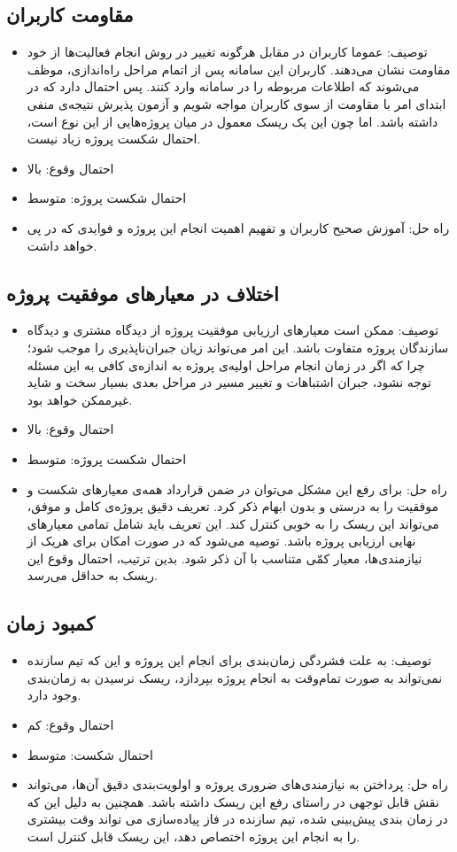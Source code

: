 \subsection{مقاومت کاربران}
\begin{itemize}
\item توصیف: عموما کاربران در مقابل هرگونه تغییر در روش انجام فعالیت‌ها از خود مقاومت نشان می‌دهند. کاربران این سامانه پس از اتمام مراحل راه‌اندازی، موظف می‌شوند که اطلاعات مربوطه را در سامانه وارد کنند. پس احتمال دارد که در ابتدای امر با مقاومت از سوی کاربران مواجه شویم و آزمون پذیرش نتیجه‌ی منفی داشته باشد. اما چون این یک ریسک معمول در میان پروژه‌هایی از این نوع است، احتمال شکست پروژه زیاد نیست.
\item احتمال وقوع: بالا
\item احتمال شکست پروژه: متوسط
\item راه حل: آموزش صحیح کاربران و تفهیم اهمیت انجام این پروژه و فوایدی که در پی خواهد داشت.
\end{itemize}

\subsection{اختلاف در معیارهای موفقیت پروژه}
\begin{itemize}
\item توصیف: ممکن است معیارهای ارزیابی موفقیت پروژه از دیدگاه مشتری و دیدگاه سازندگان پروژه متفاوت باشد. این امر می‌تواند زیان جبران‌ناپذیری را موجب شود؛ چرا که اگر در زمان انجام مراحل اولیه‌ی پروژه به اندازه‌ی کافی به این مسئله توجه نشود، جبران اشتباهات و تغییر مسیر در مراحل بعدی بسیار سخت و شاید غیرممکن خواهد بود.
\item احتمال وقوع: بالا
\item احتمال شکست پروژه: متوسط
\item راه حل: برای رفع این مشکل می‌توان در ضمن قرارداد همه‌ی معیارهای شکست و موفقیت را به درستی و بدون ابهام ذکر کرد. تعریف دقیق پروژه‌ی کامل و موفق، می‌تواند این ریسک را به خوبی کنترل کند. این تعریف باید شامل تمامی معیارهای نهایی ارزیابی پروژه باشد. توصیه می‌شود که در صورت امکان برای هریک از نیازمندی‌ها، معیار کمّی متناسب با آن ذکر شود. بدین ترتیب، احتمال وقوع این ریسک به حداقل می‌رسد.
\end{itemize}


\subsection{کمبود زمان}
\begin{itemize}
\item توصیف: به علت فشردگی زمان‌بندی برای انجام این پروژه و این که تیم سازنده نمی‌تواند به صورت تمام‌وقت به انجام پروژه بپردازد، ریسک نرسیدن به زمان‌بندی وجود دارد.
\item احتمال وقوع: کم
\item احتمال شکست: متوسط
\item راه حل: پرداختن به نیازمندی‌های ضروری پروژه و اولویت‌بندی دقیق آن‌ها، می‌تواند نقش قابل توجهی در راستای رفع این ریسک داشته باشد. همچنین به دلیل این که در زمان بندی پیش‌بینی شده، تیم سازنده در فاز پیاده‌سازی می تواند وقت بیشتری را به انجام این پروژه اختصاص دهد، این ریسک قابل کنترل است.
\end{itemize}

